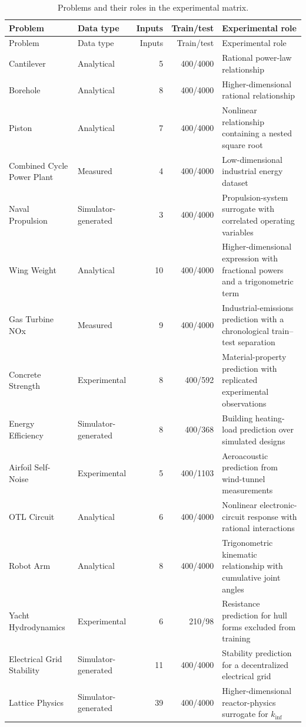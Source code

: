 \documentclass[12pt,oneside,bibtotoc,liststotoc]{scrbook}
\begin{document}
\begin{longtable}{p{2.9cm}p{2.5cm}rrp{4.4cm}}
\caption{Problems and their roles in the experimental matrix.}
\label{tab:experiment-matrix}\\
\hline
Problem & Data type & Inputs & Train/test & Experimental role \\
\hline
\endfirsthead
\hline
Problem & Data type & Inputs & Train/test & Experimental role \\
\hline
\endhead
Cantilever & Analytical & 5 & 400/4000 & Rational power-law relationship\\
Borehole & Analytical & 8 & 400/4000 & Higher-dimensional rational relationship\\
Piston & Analytical & 7 & 400/4000 & Nonlinear relationship containing a nested square root \\
Combined Cycle Power Plant & Measured & 4 & 400/4000 & Low-dimensional industrial energy dataset \\
Naval Propulsion & Simulator-generated & 3 & 400/4000 & Propulsion-system surrogate with correlated operating variables \\
Wing Weight & Analytical & 10 & 400/4000 & Higher-dimensional expression with fractional powers and a trigonometric term \\
Gas Turbine NOx & Measured & 9 & 400/4000 & Industrial-emissions prediction with a chronological train--test separation \\
Concrete Strength & Experimental & 8 & 400/592 & Material-property prediction with replicated experimental observations \\
Energy Efficiency & Simulator-generated & 8 & 400/368 & Building heating-load prediction over simulated designs \\
Airfoil Self-Noise & Experimental & 5 & 400/1103 & Aeroacoustic prediction from wind-tunnel measurements \\
OTL Circuit & Analytical & 6 & 400/4000 & Nonlinear electronic-circuit response with rational interactions \\
Robot Arm & Analytical & 8 & 400/4000 & Trigonometric kinematic relationship with cumulative joint angles \\
Yacht Hydrodynamics & Experimental & 6 & 210/98 & Resistance prediction for hull forms excluded from training \\
Electrical Grid Stability & Simulator-generated & 11 & 400/4000 & Stability prediction for a decentralized electrical grid \\
Lattice Physics & Simulator-generated & 39 & 400/4000 & Higher-dimensional reactor-physics surrogate for $k_{\mathrm{inf}}$ \\
\hline
\end{longtable}
\end{document}
